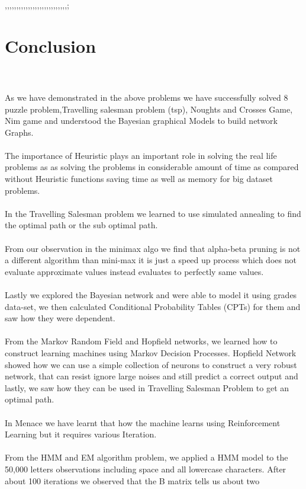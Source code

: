 ,,,,,,,,,,,,,,,,,,,,,,,,,,,;\documentclass[conference]{IEEEtran}
\begin{document}
\section*{Conclusion}
\\
\\
As we have demonstrated in the above problems we have successfully solved 8 puzzle problem,Travelling salesman problem (tsp), Noughts and Crosses Game, Nim game and understood the Bayesian graphical Models to build network Graphs.
\\
\\
The importance of Heuristic plays an important role in solving the real life problems as as solving the problems in considerable amount of time as compared without Heuristic functions saving time as well as memory for big dataset problems.
\\
\\
In the Travelling Salesman problem we learned to use simulated annealing to find the optimal path or the sub optimal path.
\\
\\
From our observation in the minimax algo we find that alpha-beta pruning is not a different algorithm than mini-max it is just a speed up process which does not evaluate approximate values instead evaluates to perfectly same values.
\\
\\
Lastly we explored the Bayesian network and were able to model it using grades data-set, we then calculated Conditional Probability Tables (CPTs) for them and saw how they were dependent.
\\
\\
From the Markov Random Field and Hopfield networks,
we learned how to construct learning machines using Markov
Decision Processes. Hopfield Network showed how we can
use a simple collection of neurons to construct a very robust
network, that can resist ignore large noises and still predict
a correct output and lastly, we saw how they can be used in
Travelling Salesman Problem to get an optimal path.
\\
\\
In Menace we have learnt that how the machine learns using Reinforcement
Learning but it requires various Iteration.
\\
\\
 From the HMM and EM algorithm problem, we applied
a HMM model to the 50,000 letters observations including
space and all lowercase characters. After about 100 iterations
we observed that the B matrix tells us about two
\end{document}
